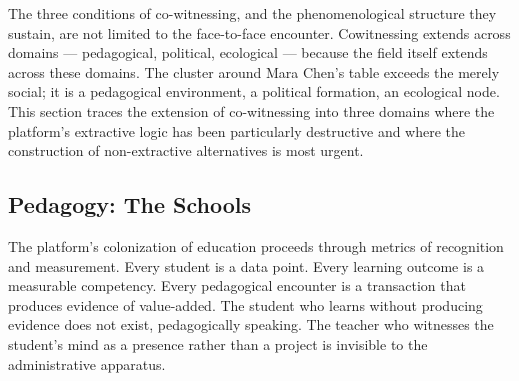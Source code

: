 The three conditions of co-witnessing, and the phenomenological structure they sustain, are not limited to the face-to-face encounter. Cowitnessing extends across domains — pedagogical, political, ecological — because the field itself extends across these domains. The cluster around Mara Chen’s table exceeds the merely social; it is a pedagogical environment, a political formation, an ecological node. This section traces the extension of co-witnessing into three domains where the platform’s extractive logic has been particularly destructive and where the construction of non-extractive alternatives is most urgent.

\subsection{Pedagogy: The  Schools}

The platform's colonization of education proceeds through metrics of recognition and measurement. Every student is a data point. Every learning outcome is a measurable competency. Every pedagogical encounter is a transaction that produces evidence of value-added. The student who learns without producing evidence does not exist, pedagogically speaking. The teacher who witnesses the student’s mind as a presence rather than a project is invisible to the administrative apparatus.

